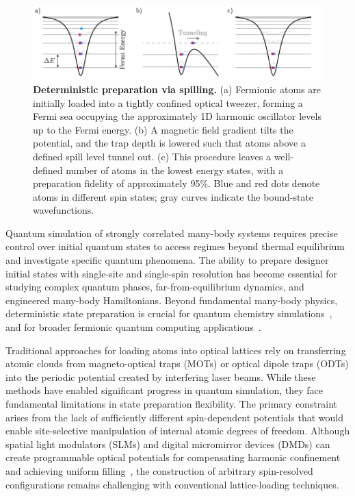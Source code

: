 

\begin{figure}
    \centering
    \includegraphics{fig-ai/preparation.pdf}
    \caption[Deterministic preparation via spilling]{
        \textbf{Deterministic preparation via spilling.}
        (a) Fermionic atoms are initially loaded into a tightly confined optical tweezer, forming a Fermi sea occupying the approximately 1D harmonic oscillator levels up to the Fermi energy. 
        (b) A magnetic field gradient tilts the potential, and the trap depth is lowered such that atoms above a defined spill level tunnel out. 
        (c) This procedure leaves a well-defined number of atoms in the lowest energy states, with a preparation fidelity of approximately 95\%. 
        Blue and red dots denote atoms in different spin states; gray curves indicate the bound-state wavefunctions.
    }
    \label{fig:preparation}
\end{figure}


Quantum simulation of strongly correlated many-body systems requires precise control over initial quantum states to access regimes beyond thermal equilibrium and investigate specific quantum phenomena. The ability to prepare designer initial states with single-site and single-spin resolution has become essential for studying complex quantum phases, far-from-equilibrium dynamics, and engineered many-body Hamiltonians. Beyond fundamental many-body physics, deterministic state preparation is crucial for quantum chemistry simulations~\cite{gkritsis_simulating_2025}, and for broader fermionic quantum computing applications~\cite{gonzalez-cuadra_fermionic_2023}.

Traditional approaches for loading atoms into optical lattices rely on transferring atomic clouds from magneto-optical traps (MOTs) or optical dipole traps (ODTs) into the periodic potential created by interfering laser beams. While these methods have enabled significant progress in quantum simulation, they face fundamental limitations in state preparation flexibility. The primary constraint arises from the lack of sufficiently different spin-dependent potentials that would enable site-selective manipulation of internal atomic degrees of freedom. Although spatial light modulators (SLMs) and digital micromirror devices (DMDs) can create programmable optical potentials for compensating harmonic confinement and achieving uniform filling~\cite{mazurenko_cold-atom_2017}, the construction of arbitrary spin-resolved configurations remains challenging with conventional lattice-loading techniques.

